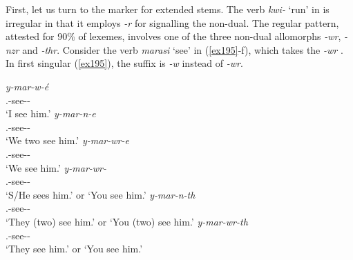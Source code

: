 First, let us turn to the  marker for extended stems. The verb \emph{kwi-} `run' in  is irregular in that it employs \emph{-r} for signalling the non-dual. The regular pattern, attested for 90\% of  lexemes, involves one of the three non-dual allomorphs \emph{-wr}, \emph{-nzr} and \emph{-thr}. Consider the verb \emph{marasi} `see' in (\ref{ex195}-f), which takes the \emph{-wr} . In first  singular (\ref{ex195}), the  suffix is \emph{-w} instead of \emph{-wr}.

\begin{exe}
\ex \label{ex204}
\begin{xlist}
	\ex
	\gll \emph{y-mar-w-é}\\
	\Tsg.\Masc-see-\Ndu-\Fsg\\
	\trans `I see him.'
	\label{ex195}
	\ex
	\gll \emph{y-mar-n-e}\\
	\Tsg.\Masc-see-\Du-\Fnsg\\
	\trans `We two see him.'
	\label{ex196}
	\ex
	\gll \emph{y-mar-wr-e}\\
	\Tsg.\Masc-see-\Ndu-\Fnsg\\
	\trans `We see him.'
	\label{ex197}
	\ex
	\gll \emph{y-mar-wr-\Zero}\\
	\Tsg.\Masc-see-\Ndu-\Stsg\\
	\trans `S/He sees him.' or `You see him.'
	\label{ex198}
	\ex
	\gll \emph{y-mar-n-th}\\
	\Tsg.\Masc-see-\Du-\Stsg\\
	\trans `They (two) see him.' or `You (two) see him.'
	\label{ex199}
	\ex
	\gll \emph{y-mar-wr-th}\\
	\Tsg.\Masc-see-\Ndu-\Stnsg\\
	\trans `They see him.' or `You see him.'
	\label{ex200}
\end{xlist}
\end{exe}

